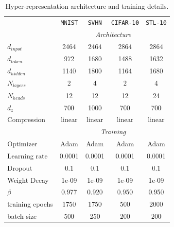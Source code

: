 \begin{table}[ht!]
    \centering
    \begin{minipage}{0.7\linewidth}
    \centering
    {\small
    \caption{Hyper-representation architecture and training details. }
    \begin{tabularx}{\linewidth}{lcccc}
    \toprule
                        & \texttt{MNIST}    & \texttt{SVHN}     & \texttt{CIFAR-10} & \texttt{STL-10}   \\
    \cmidrule(r){2-2} \cmidrule(rl){3-3}  \cmidrule(rl){4-4} \cmidrule(rl){5-5}
                        & \multicolumn{4}{c}{\textit{Architecture}} \\
    \cmidrule(r){2-2} \cmidrule(rl){3-3}  \cmidrule(rl){4-4} \cmidrule(rl){5-5}
    $d_{inpot}$         & 2464     & 2464     & 2864     & 2864     \\
    $d_{token}$         & 972      & 1680     & 1488     & 1632     \\
    $d_{hidden}$        & 1140     & 1800     & 1164     & 1680     \\
    $N_{layers}$        & 2        & 4        & 2        & 4        \\
    $N_{heads}$         & 12       & 12       & 12       & 24       \\
    $d_{z}$             & 700      & 1000     & 700      & 700      \\
    Compression         & linear   & linear   & linear   & linear   \\
    \cmidrule(r){2-2} \cmidrule(rl){3-3}  \cmidrule(rl){4-4} \cmidrule(rl){5-5}
                        & \multicolumn{4}{c}{\textit{Training}} \\
    \cmidrule(r){2-2} \cmidrule(rl){3-3}  \cmidrule(rl){4-4} \cmidrule(rl){5-5}
    Optimizer           & Adam     & Adam     & Adam     & Adam     \\
    Learning rate       & 0.0001   & 0.0001   & 0.0001   & 0.0001   \\
    Dropout             & 0.1      & 0.1      & 0.1      & 0.1      \\
    Weight Decay        & 1e-09    & 1e-09    & 1e-09    & 1e-09    \\
    $\beta$             & 0.977    & 0.920    & 0.950    & 0.950    \\
    training epochs     & 1750     & 1750     & 500      & 2000     \\
    batch size          & 500      & 250      & 200      & 200     \\
    \bottomrule
    \end{tabularx}
    \label{tab:hyper_rep_training}
    }
    \end{minipage}
    
    
\end{table}


